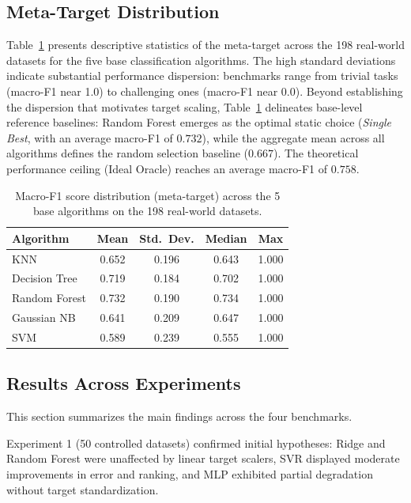 \documentclass[12pt]{article}
\begin{document}
\subsection{Meta-Target Distribution}

Table~\ref{tab:base_perf} presents descriptive statistics of the meta-target across the 198 real-world datasets for the five base classification algorithms. The high standard deviations indicate substantial performance dispersion: benchmarks range from trivial tasks (macro-F1 near 1.0) to challenging ones (macro-F1 near 0.0). Beyond establishing the dispersion that motivates target scaling, Table~\ref{tab:base_perf} delineates base-level reference baselines: Random Forest emerges as the optimal static choice (\textit{Single Best}, with an average macro-F1 of $0.732$), while the aggregate mean across all algorithms defines the random selection baseline ($0.667$). The theoretical performance ceiling (Ideal Oracle) reaches an average macro-F1 of $0.758$.

\begin{table}[ht]
\centering
\caption{Macro-F1 score distribution (meta-target) across the 5 base algorithms on the 198 real-world datasets.}
\label{tab:base_perf}
\footnotesize
\begin{tabular}{lcccc}
\toprule
\textbf{Algorithm} & \textbf{Mean} & \textbf{Std.\ Dev.} & \textbf{Median} & \textbf{Max} \\
\midrule
KNN           & 0.652 & 0.196 & 0.643 & 1.000 \\
Decision Tree & 0.719 & 0.184 & 0.702 & 1.000 \\
Random Forest & 0.732 & 0.190 & 0.734 & 1.000 \\
Gaussian NB   & 0.641 & 0.209 & 0.647 & 1.000 \\
SVM           & 0.589 & 0.239 & 0.555 & 1.000 \\
\bottomrule
\end{tabular}
\end{table}

\subsection{Results Across Experiments}

This section summarizes the main findings across the four benchmarks.

Experiment 1 (50 controlled datasets) confirmed initial hypotheses: Ridge and Random Forest were unaffected by linear target scalers, SVR displayed moderate improvements in error and ranking, and MLP exhibited partial degradation without target standardization.
\end{document}
